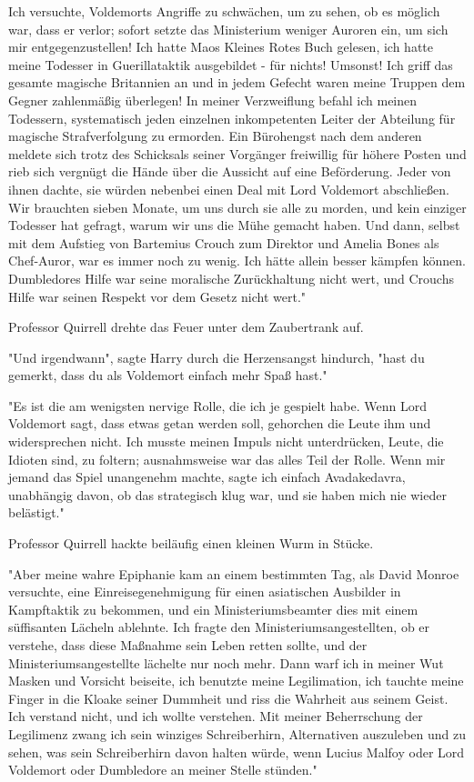 {Ich versuchte, Voldemorts Angriffe zu schwächen, um zu sehen, ob es möglich war, dass er verlor; sofort setzte das Ministerium weniger Auroren ein, um sich mir entgegenzustellen! Ich hatte Maos Kleines Rotes Buch gelesen, ich hatte meine Todesser in Guerillataktik ausgebildet - für nichts! Umsonst! Ich griff das gesamte magische Britannien an und in jedem Gefecht waren meine Truppen dem Gegner zahlenmäßig überlegen! In meiner Verzweiflung befahl ich meinen Todessern, systematisch jeden einzelnen inkompetenten Leiter der Abteilung für magische Strafverfolgung zu ermorden. Ein Bürohengst nach dem anderen meldete sich trotz des Schicksals seiner Vorgänger freiwillig für höhere Posten und rieb sich vergnügt die Hände über die Aussicht auf eine Beförderung. Jeder von ihnen dachte, sie würden nebenbei einen Deal mit Lord Voldemort abschließen. Wir brauchten sieben Monate, um uns durch sie alle zu morden, und kein einziger Todesser hat gefragt, warum wir uns die Mühe gemacht haben. Und dann, selbst mit dem Aufstieg von Bartemius Crouch zum Direktor und Amelia Bones als Chef-Auror, war es immer noch zu wenig. Ich hätte allein besser kämpfen können. Dumbledores Hilfe war seine moralische Zurückhaltung nicht wert, und Crouchs Hilfe war seinen Respekt vor dem Gesetz nicht wert."

Professor Quirrell drehte das Feuer unter dem Zaubertrank auf.

"Und irgendwann", sagte Harry durch die Herzensangst hindurch, "hast du gemerkt, dass du als Voldemort einfach mehr Spaß hast."

"Es ist die am wenigsten nervige Rolle, die ich je gespielt habe. Wenn Lord Voldemort sagt, dass etwas getan werden soll, gehorchen die Leute ihm und widersprechen nicht. Ich musste meinen Impuls nicht unterdrücken, Leute, die Idioten sind, zu foltern; ausnahmsweise war das alles Teil der Rolle. Wenn mir jemand das Spiel unangenehm machte, sagte ich einfach Avadakedavra, unabhängig davon, ob das strategisch klug war, und sie haben mich nie wieder belästigt."

Professor Quirrell hackte beiläufig einen kleinen Wurm in Stücke.

"Aber meine wahre Epiphanie kam an einem bestimmten Tag, als David Monroe versuchte, eine Einreisegenehmigung für einen asiatischen Ausbilder in Kampftaktik zu bekommen, und ein Ministeriumsbeamter dies mit einem süffisanten Lächeln ablehnte. Ich fragte den Ministeriumsangestellten, ob er verstehe, dass diese Maßnahme sein Leben retten sollte, und der Ministeriumsangestellte lächelte nur noch mehr. Dann warf ich in meiner Wut Masken und Vorsicht beiseite, ich benutzte meine Legilimation, ich tauchte meine Finger in die Kloake seiner Dummheit und riss die Wahrheit aus seinem Geist. Ich verstand nicht, und ich wollte verstehen. Mit meiner Beherrschung der Legilimenz zwang ich sein winziges Schreiberhirn, Alternativen auszuleben und zu sehen, was sein Schreiberhirn davon halten würde, wenn Lucius Malfoy oder Lord Voldemort oder Dumbledore an meiner Stelle stünden."

}

